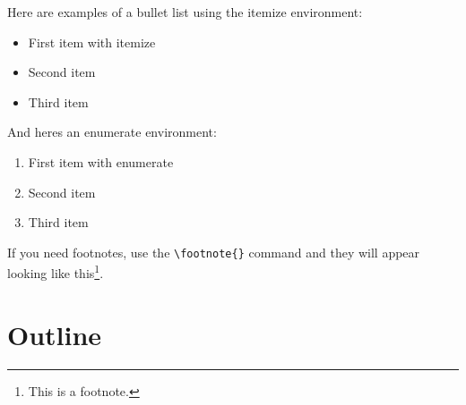 Here are examples of a bullet list using the itemize environment:

\begin{itemize}
    \item First item with itemize
    \item Second item
    \item Third item
\end{itemize}

And heres an enumerate environment:

\begin{enumerate}
    \item First item with enumerate
    \item Second item
    \item Third item
\end{enumerate}

If you need footnotes, use the \verb|\footnote{}| command and they will appear looking like this\footnote{This is a footnote.}.

\lipsum[6-8]

\section{Outline}
\label{sec:outline}

\lipsum[11]